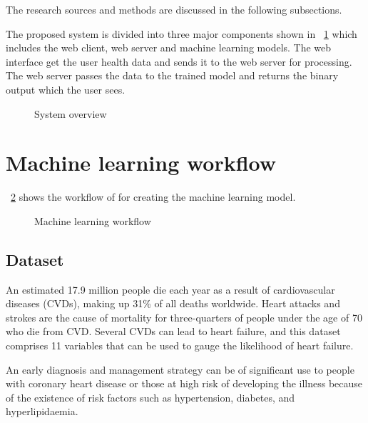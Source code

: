 
The research sources and  methods are discussed in the following subsections.

The proposed system is divided into three major components shown in \figurename~\ref{fig:sytem-overview} which includes the web client, web server and machine learning models. The web interface get the user health data and sends it to the web server for processing. The web server passes the data to the trained model and returns the binary output which the user sees.

\begin{figure}[htb]
	\centering
	\caption{System overview}
	\label{fig:sytem-overview}
\end{figure}


\section{Machine learning workflow}
\figurename~\ref{fig:ml-workflow} shows the workflow of for creating the machine learning model.

\begin{figure}[htb]
	\centering
	\caption{Machine learning workflow}
	\label{fig:ml-workflow}
\end{figure}

\subsection{Dataset}
An estimated 17.9 million people die each year as a result of cardiovascular diseases (CVDs), making up 31\% of all deaths worldwide. Heart attacks and strokes are the cause of mortality for three-quarters of people under the age of 70 who die from CVD. Several CVDs can lead to heart failure, and this dataset comprises 11 variables that can be used to gauge the likelihood of heart failure.

An early diagnosis and management strategy can be of significant use to people with coronary heart disease or those at high risk of developing the illness because of the existence of risk factors such as hypertension, diabetes, and hyperlipidaemia.

